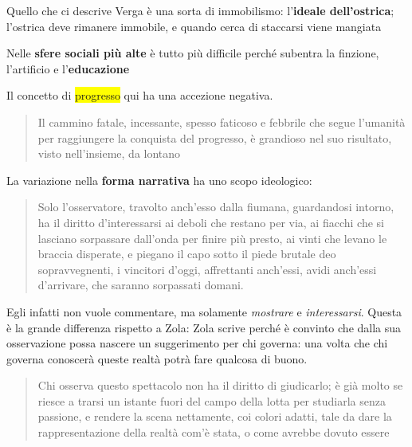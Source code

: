 \documentclass{book}
\newcommand{\pagine}[1]{\colorbox{yellow}{#1}}
\newcommand{\evidenziatore}[1]{\textbf{#1}}
\begin{document}
Quello che ci descrive Verga è una sorta di immobilismo:
l'\evidenziatore{ideale dell'ostrica}; l'ostrica deve rimanere immobile,
e quando cerca di staccarsi viene mangiata

Nelle \evidenziatore{sfere sociali più alte} è tutto più difficile
perché subentra la finzione, l'artificio e l'\textbf{educazione}

Il concetto di \pagine{progresso} qui ha una accezione negativa.

\begin{quote}
Il cammino fatale, incessante, spesso faticoso e febbrile che segue
l'umanità per raggiungere la conquista del progresso, è grandioso nel
suo risultato, visto nell'insieme, da lontano
\end{quote}

La variazione nella \evidenziatore{forma narrativa} ha uno scopo
ideologico:

\begin{quote}
Solo l'osservatore, travolto anch'esso dalla fiumana, guardandosi
intorno, ha il diritto d'interessarsi ai deboli che restano per via, ai
fiacchi che si lasciano sorpassare dall'onda per finire più presto, ai
vinti che levano le braccia disperate, e piegano il capo sotto il piede
brutale deo sopravvegnenti, i vincitori d'oggi, affrettanti anch'essi,
avidi anch'essi d'arrivare, che saranno sorpassati domani.
\end{quote}

Egli infatti non vuole commentare, ma solamente \emph{mostrare} e
\emph{interessarsi}. Questa è la grande differenza rispetto a Zola: Zola
scrive perché è convinto che dalla sua osservazione possa nascere un
suggerimento per chi governa: una volta che chi governa conoscerà queste
realtà potrà fare qualcosa di buono.

\begin{quote}
Chi osserva questo spettacolo non ha il diritto di giudicarlo; è già
molto se riesce a trarsi un istante fuori del campo della lotta per
studiarla senza passione, e rendere la scena nettamente, coi colori
adatti, tale da dare la rappresentazione della realtà com'è stata, o
come avrebbe dovuto essere
\end{quote}
\end{document}
